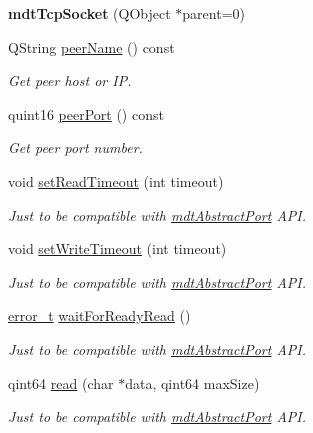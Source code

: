 \begin{DoxyCompactItemize}
\item 
\hypertarget{classmdt_tcp_socket_aeed1a50725a8e61f86de2bf67a92feb8}{
{\bfseries mdtTcpSocket} (QObject $\ast$parent=0)}
\label{classmdt_tcp_socket_aeed1a50725a8e61f86de2bf67a92feb8}

\item 
QString \hyperlink{classmdt_tcp_socket_a1ce96231767c56f8108a8e977987e10f}{peerName} () const 
\begin{DoxyCompactList}\small\item\em Get peer host or IP. \end{DoxyCompactList}\item 
quint16 \hyperlink{classmdt_tcp_socket_a2a6c3e034ca51a2f45ec136b864ba9a3}{peerPort} () const 
\begin{DoxyCompactList}\small\item\em Get peer port number. \end{DoxyCompactList}\item 
void \hyperlink{classmdt_tcp_socket_aae23057f2e0ee326d0fee78ffe3f00f9}{setReadTimeout} (int timeout)
\begin{DoxyCompactList}\small\item\em Just to be compatible with \hyperlink{classmdt_abstract_port}{mdtAbstractPort} API. \end{DoxyCompactList}\item 
void \hyperlink{classmdt_tcp_socket_ac59d2dfdf405b5382f0f20d5b9f75fd0}{setWriteTimeout} (int timeout)
\begin{DoxyCompactList}\small\item\em Just to be compatible with \hyperlink{classmdt_abstract_port}{mdtAbstractPort} API. \end{DoxyCompactList}\item 
\hyperlink{classmdt_abstract_port_ad4121bb930c95887e77f8bafa065a85e}{error\_\-t} \hyperlink{classmdt_tcp_socket_adb09186cdacdac15291523c59f156cd4}{waitForReadyRead} ()
\begin{DoxyCompactList}\small\item\em Just to be compatible with \hyperlink{classmdt_abstract_port}{mdtAbstractPort} API. \end{DoxyCompactList}\item 
qint64 \hyperlink{classmdt_tcp_socket_a78842bc5ddcac2d96fb368ee575214cd}{read} (char $\ast$data, qint64 maxSize)
\begin{DoxyCompactList}\small\item\em Just to be compatible with \hyperlink{classmdt_abstract_port}{mdtAbstractPort} API. \end{DoxyCompactList}\item 

\end{DoxyCompactItemize}
